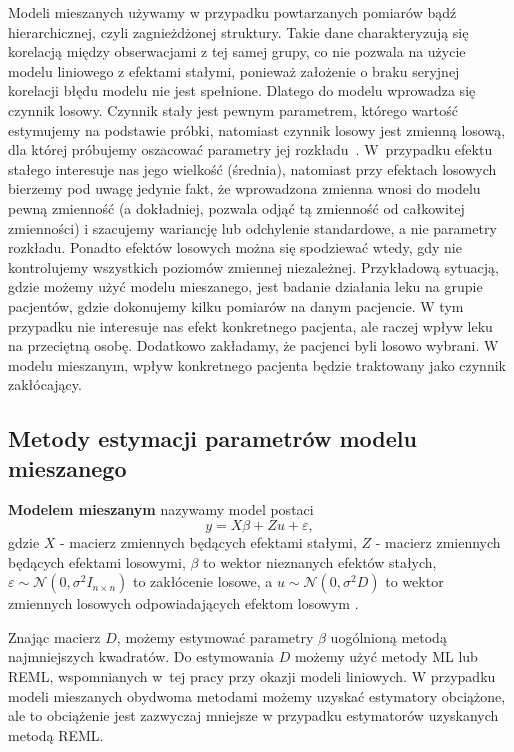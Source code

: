 \documentclass[12pt]{mwbk}
\theoremstyle{plain}
\theoremstyle{definition}
\theoremstyle{definition}
\begin{document}
Modeli mieszanych używamy w przypadku powtarzanych pomiarów bądź hierarchicznej, czyli zagnieżdżonej struktury. Takie dane charakteryzują się korelacją między obserwacjami z tej samej grupy, co nie pozwala na użycie modelu liniowego z efektami stałymi, ponieważ założenie o braku seryjnej korelacji błędu modelu nie jest spełnione. Dlatego do modelu wprowadza się czynnik losowy.  Czynnik stały jest pewnym parametrem, którego wartość estymujemy na podstawie próbki, natomiast czynnik losowy jest zmienną losową, dla której próbujemy oszacować parametry jej rozkładu~\cite{faraway}. W~przypadku efektu stałego interesuje nas jego wielkość (średnia), natomiast przy efektach losowych bierzemy pod uwagę jedynie fakt, że wprowadzona zmienna wnosi do modelu pewną zmienność (a dokładniej, pozwala odjąć tą zmienność od całkowitej zmienności) i szacujemy wariancję lub odchylenie standardowe, a nie parametry rozkładu. Ponadto efektów losowych można się spodziewać wtedy, gdy nie kontrolujemy wszystkich poziomów zmiennej niezależnej. Przykładową sytuacją, gdzie możemy użyć modelu mieszanego, jest badanie działania leku na grupie pacjentów, gdzie dokonujemy kilku pomiarów na danym pacjencie. W tym przypadku nie interesuje nas efekt konkretnego pacjenta, ale raczej wpływ leku na przeciętną osobę. Dodatkowo zakładamy, że pacjenci byli losowo wybrani. W modelu mieszanym, wpływ konkretnego pacjenta będzie traktowany jako czynnik zakłócający.


\newpage

\subsection{Metody estymacji parametrów modelu mieszanego}

\textbf{Modelem mieszanym} nazywamy model postaci
$$y=X\beta +Z u + \varepsilon,$$
gdzie $X$ - macierz zmiennych będących efektami stałymi, $Z$ - macierz zmiennych będących efektami losowymi, $\beta$ to wektor nieznanych efektów stałych, $\varepsilon \sim \mathcal{N}(0, \sigma^2 I_{n\times n})$ to zakłócenie losowe, a $u \sim \mathcal{N} (0, \sigma^2D)$ to wektor zmiennych losowych odpowiadających efektom losowym \cite{biecek}.

Znając macierz $D$, możemy estymować parametry $\beta$ uogólnioną metodą najmniejszych kwadratów. Do estymowania $D$ możemy użyć metody ML lub REML, wspomnianych w~tej pracy przy okazji modeli liniowych. W przypadku modeli mieszanych obydwoma metodami możemy uzyskać estymatory obciążone, ale to obciążenie jest zazwyczaj mniejsze w przypadku estymatorów uzyskanych metodą REML.
\end{document}
